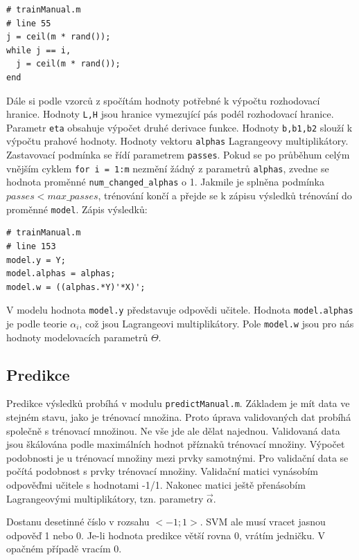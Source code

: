 \documentclass[a4]{article}
\begin{document}
\begin{lstlisting}
# trainManual.m
# line 55
j = ceil(m * rand());
while j == i,
  j = ceil(m * rand());
end
\end{lstlisting}

\noindent Dále si podle vzorců z \cite{smo_platt_original} spočítám hodnoty potřebné k výpočtu rozhodovací hranice. Hodnoty \texttt{L,H} jsou hranice vymezující pás podél rozhodovací hranice. Parametr \texttt{eta} obsahuje výpočet druhé derivace funkce. Hodnoty \texttt{b,b1,b2}  slouží k výpočtu prahové hodnoty. Hodnoty vektoru \texttt{alphas} Lagrangeovy multiplikátory. Zastavovací podmínka se řídí parametrem \texttt{passes}. Pokud se po průběhum celým vnějším cyklem \texttt{for i = 1:m} nezmění žádný z parametrů \texttt{alphas}, zvedne se hodnota proměnné \texttt{num\_changed\_alphas} o 1. Jakmile je splněna podmínka $passes < max\_passes$, trénování končí a přejde se k zápisu výsledků trénování do proměnné \texttt{model}. Zápis výsledků:

\begin{lstlisting}
# trainManual.m
# line 153
model.y = Y;
model.alphas = alphas;
model.w = ((alphas.*Y)'*X)';
\end{lstlisting}

\noindent V modelu hodnota \texttt{model.y} představuje odpovědi učitele. Hodnota \texttt{model.alphas} je podle teorie $\alpha_i$, což jsou Lagrangeovi multiplikátory. Pole \texttt{model.w} jsou pro nás hodnoty modelovacích parametrů $\Theta$.

\subsection{Predikce}
Predikce výsledků probíhá v modulu \texttt{predictManual.m}. Základem je mít data ve stejném stavu, jako je trénovací množina. Proto úprava validovaných dat probíhá společně s trénovací množinou. Ne vše jde ale dělat najednou. Validovaná data jsou škálována podle maximálních hodnot příznaků trénovací množiny. Výpočet podobnosti je u trénovací množiny mezi prvky samotnými. Pro validační data se počítá podobnost s prvky trénovací množiny. Validační matici vynásobím odpověďmi učitele s hodnotami -1/1. Nakonec matici ještě přenásobím Lagrangeovými multiplikátory, tzn. parametry $\vec{\alpha}$.

\noindent Dostanu desetinné číslo v rozsahu $<-1;1>$. SVM ale musí vracet jasnou odpověď 1 nebo 0. Je-li hodnota predikce větší rovna 0, vrátím jedničku. V opačném případě vracím 0.
\end{document}
